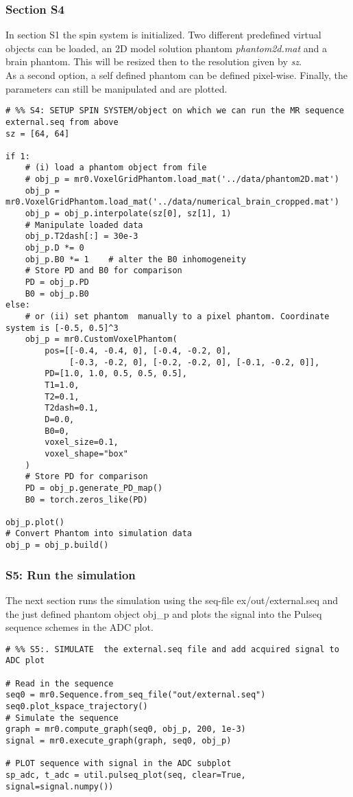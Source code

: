 \documentclass[a4paper,12pt]{extarticle}
\begin{document}
\subsubsection{Section S4}
In section S1 the spin system is initialized. Two different predefined virtual objects can be loaded, an 2D model solution phantom \emph{phantom2d.mat} and a brain phantom. This will be resized then to the resolution given by \emph{sz}.  \\
As a second option, a self defined phantom can be defined pixel-wise.
Finally, the parameters can still be manipulated and are plotted.

\begin{verbatim}
# %% S4: SETUP SPIN SYSTEM/object on which we can run the MR sequence external.seq from above
sz = [64, 64]

if 1:
    # (i) load a phantom object from file
    # obj_p = mr0.VoxelGridPhantom.load_mat('../data/phantom2D.mat')
    obj_p = mr0.VoxelGridPhantom.load_mat('../data/numerical_brain_cropped.mat')
    obj_p = obj_p.interpolate(sz[0], sz[1], 1)
    # Manipulate loaded data
    obj_p.T2dash[:] = 30e-3
    obj_p.D *= 0 
    obj_p.B0 *= 1    # alter the B0 inhomogeneity
    # Store PD and B0 for comparison
    PD = obj_p.PD
    B0 = obj_p.B0
else:
    # or (ii) set phantom  manually to a pixel phantom. Coordinate system is [-0.5, 0.5]^3
    obj_p = mr0.CustomVoxelPhantom(
        pos=[[-0.4, -0.4, 0], [-0.4, -0.2, 0],
             [-0.3, -0.2, 0], [-0.2, -0.2, 0], [-0.1, -0.2, 0]],
        PD=[1.0, 1.0, 0.5, 0.5, 0.5],
        T1=1.0,
        T2=0.1,
        T2dash=0.1,
        D=0.0,
        B0=0,
        voxel_size=0.1,
        voxel_shape="box"
    )
    # Store PD for comparison
    PD = obj_p.generate_PD_map()
    B0 = torch.zeros_like(PD)

obj_p.plot()
# Convert Phantom into simulation data
obj_p = obj_p.build()

\end{verbatim}

\subsubsection{S5: Run the simulation}
The next section runs the simulation using the seq-file ex/out/external.seq and  the just defined phantom object obj\_p and plots the signal into the Pulseq sequence schemes in the ADC plot.

\begin{verbatim}
# %% S5:. SIMULATE  the external.seq file and add acquired signal to ADC plot

# Read in the sequence
seq0 = mr0.Sequence.from_seq_file("out/external.seq")
seq0.plot_kspace_trajectory()
# Simulate the sequence
graph = mr0.compute_graph(seq0, obj_p, 200, 1e-3)
signal = mr0.execute_graph(graph, seq0, obj_p)

# PLOT sequence with signal in the ADC subplot
sp_adc, t_adc = util.pulseq_plot(seq, clear=True, signal=signal.numpy())
\end{verbatim}
\end{document}

